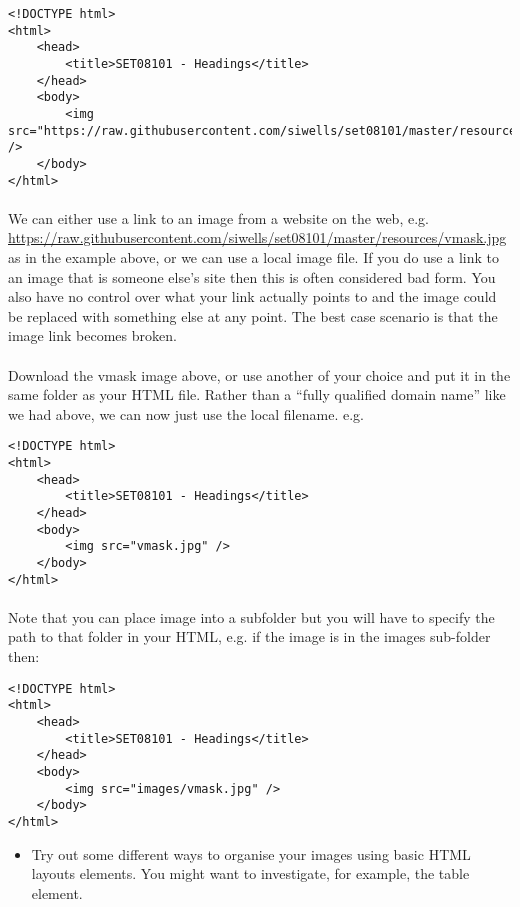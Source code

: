 \documentclass[10pt, a4paper]{article}
\begin{document}
\begin{lstlisting}
<!DOCTYPE html>
<html>
    <head>
        <title>SET08101 - Headings</title>
    </head>
    <body>
        <img src="https://raw.githubusercontent.com/siwells/set08101/master/resources/vmask.jpg" />      
    </body>
</html>
\end{lstlisting}

\paragraph{} We can either use a link to an image from a website on the web, e.g. \url{https://raw.githubusercontent.com/siwells/set08101/master/resources/vmask.jpg} as in the example above, or we can use a local image file. If you do use a link to an image that is someone else's site then this is often considered bad form. You also have no control over what your link actually points to and the image could be replaced with something else at any point. The best case scenario is that the image link becomes broken. 

\paragraph{} Download the vmask image above, or use another of your choice and put it in the same folder as your HTML file. Rather than a ``fully qualified domain name'' like we had above, we can now just use the local filename. e.g.

\begin{lstlisting}
<!DOCTYPE html>
<html>
    <head>
        <title>SET08101 - Headings</title>
    </head>
    <body>
        <img src="vmask.jpg" />      
    </body>
</html>
\end{lstlisting}

\paragraph{} Note that you can place image into a subfolder but you will have to specify the path to that folder in your HTML, e.g. if the image is in the images sub-folder then:

\begin{lstlisting}
<!DOCTYPE html>
<html>
    <head>
        <title>SET08101 - Headings</title>
    </head>
    <body>
        <img src="images/vmask.jpg" /> 
    </body>
</html>
\end{lstlisting}


\begin{itemize}
\item Try out some different ways to organise your images using basic HTML layouts elements. You might want to investigate, for example, the table element.
\end{itemize}
\end{document}

